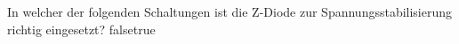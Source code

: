     {In welcher der folgenden Schaltungen ist die Z-Diode zur Spannungsstabilisierung richtig eingesetzt?}
    {}
    {}
    {}
    {}
    {false}{true}